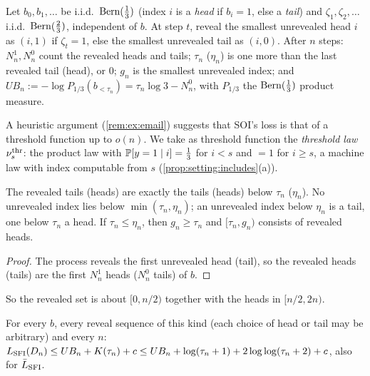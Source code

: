 \begin{definition}\label{def:ex:eisenstat}
Let $b_0,b_1,\dots$ be i.i.d.\ $\operatorname{Bern}(\frac13)$ (index $i$ is a \emph{head} if $b_i=1$, else a \emph{tail}) and $\zeta_1,\zeta_2,\dots$ i.i.d.\ $\operatorname{Bern}(\frac23)$, independent of $b$. At step $t$, reveal the smallest unrevealed head $i$ as $(i,1)$ if $\zeta_t=1$, else the smallest unrevealed tail as $(i,0)$. After $n$ steps: $N^1_n,N^0_n$ count the revealed heads and tails; $\tau_n$ ($\eta_n$) is one more than the last revealed tail (head), or $0$; $g_n$ is the smallest unrevealed index; and $UB_n:=-\log P_{1/3}(b_{<\tau_n})=\tau_n\log3-N^0_n$, with $P_{1/3}$ the $\operatorname{Bern}(\frac13)$ product measure.
\end{definition}

A heuristic argument (\cref{rem:ex:email}) suggests that SOI's loss is that of a threshold function up to $o(n)$. We take as threshold function the \emph{threshold law} $\nu^{\rm thr}_s$: the product law with $\mathbb{P}[y=1\mid i]=\frac13$ for $i<s$ and $=1$ for $i\ge s$, a machine law with index computable from $s$ (\cref{prop:setting:includes}(a)).

\begin{lemma}\label{lem:ex:shape}
The revealed tails (heads) are exactly the tails (heads) below $\tau_n$ ($\eta_n$). No unrevealed index lies below $\min(\tau_n,\eta_n)$; an unrevealed index below $\eta_n$ is a tail, one below $\tau_n$ a head. If $\tau_n\le\eta_n$, then $g_n\ge\tau_n$ and $[\tau_n,g_n)$ consists of revealed heads.
\end{lemma}

\begin{proof}
The process reveals the first unrevealed head (tail), so the revealed heads (tails) are the first $N^1_n$ heads ($N^0_n$ tails) of $b$.
\end{proof}

So the revealed set is about $[0,n/2)$ together with the heads in $[n/2,2n)$.

\begin{proposition}\label{prop:ex:UB}
For every $b$, every reveal sequence of this kind (each choice of head or tail may be arbitrary) and every $n$: $L_{\mathrm{SFI}}(D_n)\le UB_n+K(\tau_n)+c\le UB_n+\log(\tau_n+1)+2\log\log(\tau_n+2)+c$, also for $\bar{L}_{\mathrm{SFI}}$.
\end{proposition}

